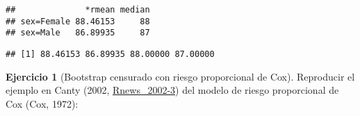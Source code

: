 \documentclass[
]{book}
\newenvironment{Shaded}{\begin{snugshade}}{\end{snugshade}}
\newcommand{\AttributeTok}[1]{\textcolor[rgb]{0.77,0.63,0.00}{#1}}
\newcommand{\CommentTok}[1]{\textcolor[rgb]{0.56,0.35,0.01}{\textit{#1}}}
\newcommand{\DecValTok}[1]{\textcolor[rgb]{0.00,0.00,0.81}{#1}}
\newcommand{\FunctionTok}[1]{\textcolor[rgb]{0.00,0.00,0.00}{#1}}
\newcommand{\NormalTok}[1]{#1}
\newcommand{\OtherTok}[1]{\textcolor[rgb]{0.56,0.35,0.01}{#1}}
\newcommand{\SpecialCharTok}[1]{\textcolor[rgb]{0.00,0.00,0.00}{#1}}
\newcommand{\StringTok}[1]{\textcolor[rgb]{0.31,0.60,0.02}{#1}}
\theoremstyle{break}
\theoremstyle{definition}
\theoremstyle{definition}
\theoremstyle{definition}
\newtheorem{exercise}{Ejercicio}[chapter]
\theoremstyle{definition}
\theoremstyle{remark}
\begin{document}
\begin{Shaded}
\end{Shaded}

\begin{verbatim}
##              *rmean median
## sex=Female 88.46153     88
## sex=Male   86.89935     87
\end{verbatim}

\begin{Shaded}
\end{Shaded}

\begin{verbatim}
## [1] 88.46153 86.89935 88.00000 87.00000
\end{verbatim}

\begin{exercise}[Bootstrap censurado con riesgo proporcional de Cox]
\protect\hypertarget{exr:censboot-cox-ej}{}{\label{exr:censboot-cox-ej} \iffalse (Bootstrap censurado con riesgo proporcional de Cox) \fi{} }
Reproducir el ejemplo en Canty (2002, \href{http://cran.fhcrc.org/doc/Rnews/Rnews_2002-3.pdf}{Rnews\_2002-3}) del modelo de riesgo proporcional de Cox (Cox, 1972):
\end{exercise}

\begin{Shaded}
\end{Shaded}
\end{document}
